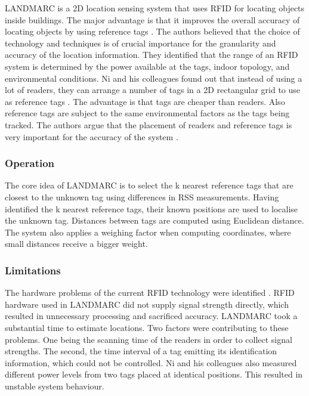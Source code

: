LANDMARC is a 2D location sensing system that uses RFID for locating objects inside buildings. The major advantage is that it improves the overall accuracy of locating objects by using reference tags \cite{Ni2004}. The authors believed that the choice of technology and techniques is of crucial importance for the granularity and accuracy of the location information. They identified that the range of an RFID system is determined by the power available at the tags, indoor topology, and environmental conditions. Ni and his colleagues found out that instead of using a lot of readers, they can arrange a number of tags in a 2D rectangular grid to use as reference tags \cite{Ni2004}. The advantage is that tags are cheaper than readers. Also reference tags are subject to the same environmental factors as the tags being tracked. The authors argue that the placement of readers and reference tags is very important for the accuracy of the system \cite{Ni2004}.

\subsubsection{Operation}

The core idea of LANDMARC is to select the k nearest reference tags that are closest to the unknown tag using differences in RSS measurements. Having identified the k nearest reference tags, their known positions are used to localise the unknown tag. Distances between tags are computed using Euclidean distance. The system also applies a weighing factor when computing coordinates, where small distances receive a bigger weight.

\subsubsection{Limitations}

The hardware problems of the current RFID technology were identified \cite{Ni2004}. RFID hardware used in LANDMARC did not supply signal strength directly, which resulted in unnecessary processing and sacrificed accuracy. LANDMARC took a substantial time to estimate locations. Two factors were contributing to these problems. One being the scanning time of the readers in order to collect signal strengths. The second, the time interval of a tag emitting its identification information, which could not be controlled. Ni and his colleagues also measured different power levels from two tags placed at identical positions. This resulted in unstable system behaviour.

